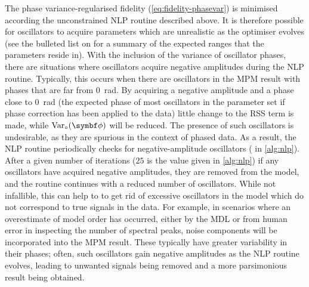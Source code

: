 The phase variance-regularised fidelity (\cref{eq:fidelity-phasevar}) is
minimised according the unconstrained \ac{NLP} routine described above. It is
therefore possible for oscillators to acquire parameters which are unrealistic
as the optimiser evolves (see the bulleted list on
 for a summary of
the expected ranges that the parameters reside in). With the inclusion of
the variance of oscillator phases, there are situations where oscillators
acquire negative amplitudes during the \ac{NLP} routine. Typically, this occurs
when there are oscillators in the \ac{MPM} result with phases
that are far from \qty{0}{\radian}. By acquiring a negative amplitude and a
phase close to
\qty{0}{\radian} (the expected phase of most oscillators in the parameter set
if phase correction has been applied to the data)
little change to the \ac{RSS} term is made, while
$\circvar$ will be reduced. The presence of such oscillators is
undesirable, as they are spurious in the context of phased data. As a
result, the \ac{NLP} routine periodically checks for negative-amplitude oscillators
( in \cref{alg:nlp}). After a
given number of iterations ($25$ is the value given in \cref{alg:nlp})
if any oscillators have acquired negative
amplitudes, they are removed from the model, and the routine continues with a reduced number
of oscillators. While not infallible, this can help to to get rid of excessive oscillators in the
model which do not correspond to true signals in the data. For example, in
scenarios where an overestimate of model order has occurred, either by the
\ac{MDL} or from human error in inspecting the number of spectral peaks, noise
components will be incorporated into the \ac{MPM} result. These typically have
greater variability in their phases; often, such oscillators gain negative
amplitudes as the \ac{NLP} routine evolves, leading to unwanted signals being
removed and a more parsimonious result being obtained.
